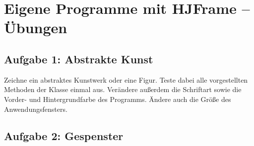 \clearpage

\rehead[]{\textcolor{lightblue}{AvHG, Inf, My}}
\lohead[]{\textcolor{lightblue}{AvHG, Inf, My}}

\section{Eigene Programme mit HJFrame -- Übungen}

\subsection{Aufgabe 1: Abstrakte Kunst}

Zeichne ein abstraktes Kunstwerk oder eine Figur. Teste dabei alle
vorgestellten Methoden der Klasse  einmal aus. Verändere
außerdem die Schriftart sowie die Vorder- und Hintergrundfarbe des Programms.
Ändere auch die Größe des Anwendungsfensters.

\subsection{Aufgabe 2: Gespenster}

